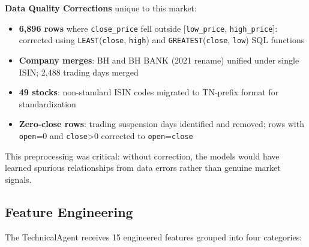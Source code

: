 \documentclass[conference]{IEEEtran}
\begin{document}
\textbf{Data Quality Corrections} unique to this market:
\begin{itemize}
\item \textbf{6,896 rows} where \texttt{close\_price} fell outside [\texttt{low\_price}, \texttt{high\_price}]: corrected using \texttt{LEAST}(\texttt{close}, \texttt{high}) and \texttt{GREATEST}(\texttt{close}, \texttt{low}) SQL functions
\item \textbf{Company merges}: BH and BH BANK (2021 rename) unified under single ISIN; 2,488 trading days merged
\item \textbf{49 stocks}: non-standard ISIN codes migrated to TN-prefix format for standardization
\item \textbf{Zero-close rows}: trading suspension days identified and removed; rows with \texttt{open}=0 and \texttt{close}>0 corrected to \texttt{open}=\texttt{close}
\end{itemize}

This preprocessing was critical: without correction, the models would have learned spurious relationships from data errors rather than genuine market signals.

\subsection{Feature Engineering}

The TechnicalAgent receives 15 engineered features grouped into four categories:
\end{document}

